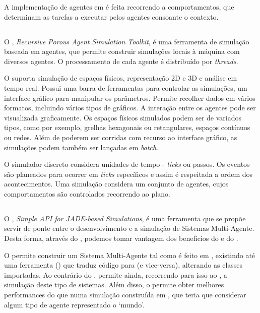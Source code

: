 \documentclass[12pt]{report}
\begin{document}
A implementação de agentes em \jade é feita recorrendo a comportamentos, que determinam as tarefas a executar pelos agentes consoante o contexto. 

\subsection{\repast}
O \repast, \emph{Recursive Porous Agent Simulation Toolkit}, é uma ferramenta de simulação baseada em agentes, que permite construir simulações locais à máquina com diversos agentes. O processamento de cada agente é distribuído por \emph{threads}.

O \repast suporta simulação de espaços físicos, representação 2D e 3D e análise em tempo real. Possui uma barra de ferramentas para controlar as simulações, um interface gráfico para manipular os parâmetros. Permite recolher dados em vários formatos, incluindo vários tipos de gráficos. A interação entre os agentes pode ser visualizada graficamente. Os espaços físicos simulados podem ser de variados tipos, como por exemplo, grelhas hexagonais ou retangulares, espaços contínuos ou redes. Além de poderem ser corridas com recurso ao interface gráfico, as simulações podem também ser lançadas em \emph{batch}.
  
O simulador discreto considera unidades de tempo - \emph{ticks} ou passos. Os eventos são planeados para ocorrer em \emph{ticks} específicos e assim é respeitada a ordem dos acontecimentos. Uma simulação considera um conjunto de agentes, cujos comportamentos são controlados recorrendo ao plano.

\subsection{\sajas}
O \sajas, \emph{Simple API for JADE-based Simulations}, é uma ferramenta que se propõe servir de ponte entre o desenvolvimento e a simulação de Sistemas Multi-Agente. Desta forma, através do \sajas, podemos tomar vantagem dos benefícios do \jade e do \repast.

O \sajas permite construir um Sistema Multi-Agente tal como é feito em \jade, existindo até uma ferramenta (\massim) que traduz código \jade para \sajas (e vice-versa), alterando as classes importadas. Ao contrário do \jade, permite ainda, recorrendo para isso ao \repast, a simulação deste tipo de sistemas. Além disso, o \sajas permite obter melhores performances do que numa simulação construída em \jade, que teria que considerar algum tipo de agente representado o `mundo'.
\end{document}
